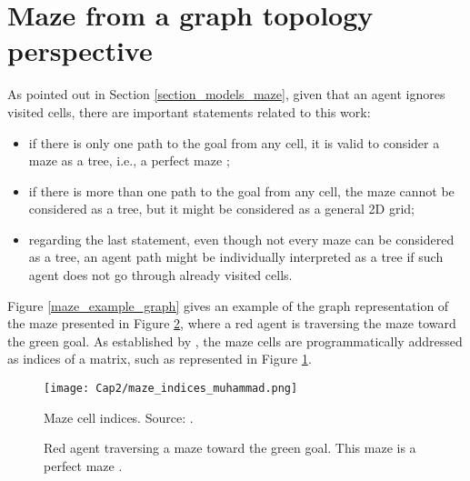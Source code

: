 \section{Maze from a graph topology perspective}
\label{section_models_maze_graph}
As pointed out in Section \ref{section_models_maze}, given that an agent ignores visited cells, there are important statements related to this work:

\begin{itemize}
\item if there is only one path to the goal from any cell, it is valid to consider a maze as a tree, i.e., a perfect maze \cite{Muhammad2021};

\item if there is more than one path to the goal from any cell, the maze cannot be considered as a tree, but it might be considered as a general 2D grid;

\item regarding the last statement, even though not every maze can be considered as a tree, an agent path might be individually interpreted as a tree if such agent does not go through already visited cells.
\end{itemize}

Figure \ref{maze_example_graph} gives an example of the graph representation of the maze presented in Figure \ref{maze_example}, where a red agent is traversing the maze toward the green goal. As established by , the maze cells are programmatically addressed as indices of a matrix, such as represented in Figure \ref{maze_indices_muhammad}.

\begin{figure}[ht!]
\centering
\texttt{[image: Cap2/maze\_indices\_muhammad.png]}
\caption{Maze cell indices. Source: .}
\label{maze_indices_muhammad}
\end{figure}

\begin{figure}
    \centering
    \qquad
    \qquad
    \caption{Red agent traversing a maze toward the green goal. This maze is a perfect maze \cite{Muhammad2021}.}
    \label{maze_example}
\end{figure}

